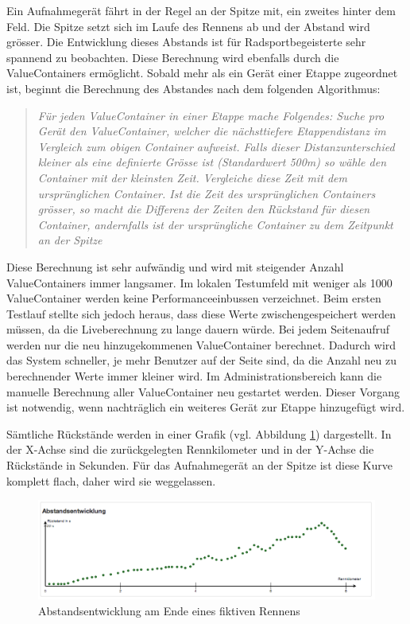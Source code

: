 Ein Aufnahmegerät fährt in der Regel an der Spitze mit, ein zweites hinter dem Feld. Die Spitze setzt sich im Laufe des Rennens ab und der Abstand wird grösser. Die Entwicklung dieses Abstands ist für Radsportbegeisterte sehr spannend zu beobachten. Diese Berechnung wird ebenfalls durch die ValueContainers ermöglicht. Sobald mehr als ein Gerät einer Etappe zugeordnet ist, beginnt die Berechnung des Abstandes nach dem folgenden Algorithmus:
\begin{quotation}
\label{quot:deficitealgo}
\textit{Für jeden ValueContainer in einer Etappe mache Folgendes:
Suche pro Gerät den ValueContainer, welcher die nächsttiefere Etappendistanz im Vergleich zum obigen Container aufweist. Falls dieser Distanzunterschied kleiner als eine definierte Grösse ist (Standardwert 500m) so wähle den Container mit der kleinsten Zeit. Vergleiche diese Zeit mit dem ursprünglichen Container. Ist die Zeit des ursprünglichen Containers grösser, so macht die Differenz der Zeiten den Rückstand für diesen Container, andernfalls ist der ursprüngliche Container zu dem Zeitpunkt an der Spitze}
\end{quotation}

Diese Berechnung ist sehr aufwändig und wird mit steigender Anzahl ValueContainers immer langsamer. Im lokalen Testumfeld mit weniger als 1000 ValueContainer werden keine Performanceeinbussen verzeichnet. Beim ersten Testlauf stellte sich jedoch heraus, dass diese Werte zwischengespeichert werden müssen, da die Liveberechnung zu lange dauern würde. Bei jedem Seitenaufruf werden nur die neu hinzugekommenen ValueContainer berechnet. Dadurch wird das System schneller, je mehr Benutzer auf der Seite sind, da die Anzahl neu zu berechnender Werte immer kleiner wird. Im Administrationsbereich kann die manuelle Berechnung aller ValueContainer neu gestartet werden. Dieser Vorgang ist notwendig, wenn nachträglich ein weiteres Gerät zur Etappe hinzugefügt wird.

Sämtliche Rückstände werden in einer Grafik (vgl. Abbildung  \ref{fig:abstandsentwicklung2}) dargestellt. In der X-Achse sind die zurückgelegten Rennkilometer und in der Y-Achse die Rückstände in Sekunden. Für das Aufnahmegerät an der Spitze ist diese Kurve komplett flach, daher wird sie weggelassen.

\begin{figure}[H]
	\centering
	\includegraphics[width=130mm]{images/tourliveweb/abstandsentwicklung2.png}
	\caption{Abstandsentwicklung am Ende eines fiktiven Rennens}
	\label{fig:abstandsentwicklung2}
\end{figure}

